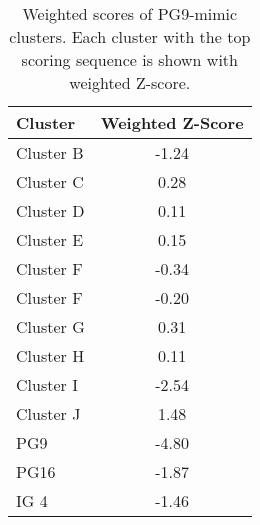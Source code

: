 \begin{table}[!h]
\centering
\begin{tabular}{lc}
\textbf{Cluster}   & \textbf{Weighted Z-Score} \\
\hline
Cluster B & -1.24            \\
Cluster C & 0.28             \\
Cluster D & 0.11             \\
Cluster E & 0.15             \\
Cluster F & -0.34            \\
Cluster F & -0.20            \\
Cluster G & 0.31             \\
Cluster H & 0.11             \\
Cluster I & -2.54            \\
Cluster J & 1.48             \\
PG9       & -4.80            \\
PG16      & -1.87            \\
IG 4      & -1.46
\end{tabular}
\caption[Weighted Scores of PG9-Mimic Clusters]{Weighted scores of PG9-mimic clusters. Each cluster with the top scoring sequence is shown with weighted Z-score.}
\label{tab:table3_4}
\end{table}